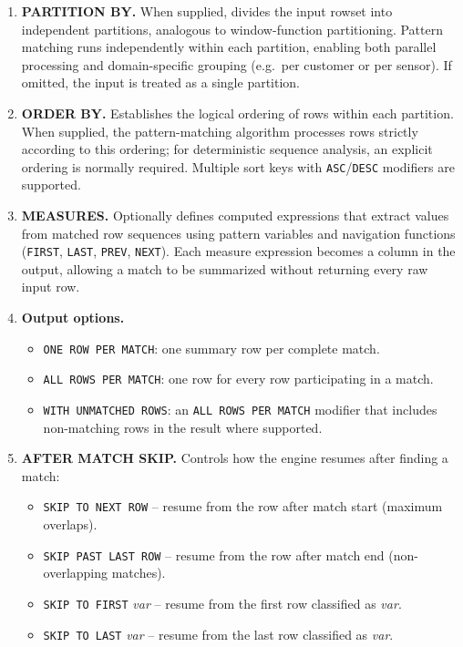 \begin{enumerate}

\item \textbf{PARTITION BY.}
  When supplied, divides the input rowset into independent partitions,
  analogous to window-function partitioning.  Pattern matching runs
  independently within each partition, enabling both parallel
  processing and domain-specific grouping (e.g.\ per customer or per
  sensor).  If omitted, the input is treated as a single partition.

\item \textbf{ORDER BY.}
  Establishes the logical ordering of rows within each partition.
  When supplied, the pattern-matching algorithm processes rows
  strictly according to this ordering; for deterministic sequence
  analysis, an explicit ordering is normally required.  Multiple sort
  keys with \texttt{ASC}/\texttt{DESC} modifiers are supported.

\item \textbf{MEASURES.}
  Optionally defines computed expressions that extract values from
  matched row sequences using pattern variables and navigation functions
  (\texttt{FIRST}, \texttt{LAST}, \texttt{PREV}, \texttt{NEXT}).
  Each measure expression becomes a column in the output, allowing a
  match to be summarized without returning every raw input row.

\item \textbf{Output options.}
  \begin{itemize}
    \item \texttt{ONE ROW PER MATCH}: one summary row per complete
      match.
    \item \texttt{ALL ROWS PER MATCH}: one row for every row
      participating in a match.
    \item \texttt{WITH UNMATCHED ROWS}: an
      \texttt{ALL ROWS PER MATCH} modifier that includes
      non-matching rows in the result where supported.
  \end{itemize}

\item \textbf{AFTER MATCH SKIP.}
  Controls how the engine resumes after finding a match:
  \begin{itemize}
    \item \texttt{SKIP TO NEXT ROW} -- resume from the row after
      match start (maximum overlaps).
    \item \texttt{SKIP PAST LAST ROW} -- resume from the row after
      match end (non-overlapping matches).
    \item \texttt{SKIP TO FIRST} \textit{var} -- resume from the
      first row classified as \textit{var}.
    \item \texttt{SKIP TO LAST} \textit{var} -- resume from the last
      row classified as \textit{var}.
  \end{itemize}


\end{enumerate}
